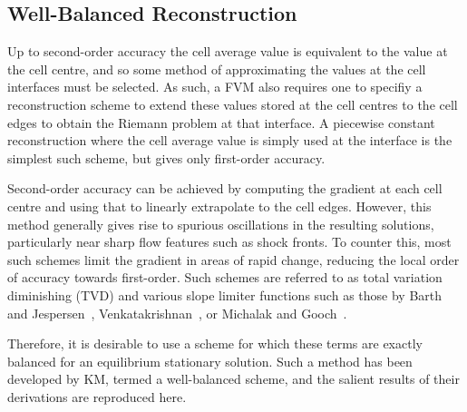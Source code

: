 \subsection{Well-Balanced Reconstruction}
\label{subsec:wellBalanced}

Up to second-order accuracy the cell average value is equivalent to the value at the cell centre, and so some method of approximating the values at the cell interfaces must be selected. As such, a FVM also requires one to specifiy a reconstruction scheme to extend these values stored at the cell centres to the cell edges to obtain the Riemann problem at that interface. A piecewise constant reconstruction where the cell average value is simply used at the interface is the simplest such scheme, but gives only first-order accuracy.

Second-order accuracy can be achieved by computing the gradient at each cell centre and using that to linearly extrapolate to the cell edges. However, this method generally gives rise to spurious oscillations in the resulting solutions, particularly near sharp flow features such as shock fronts. To counter this, most such schemes limit the gradient in areas of rapid change, reducing the local order of accuracy towards first-order. Such schemes are referred to as total variation diminishing (TVD) and various slope limiter functions such as those by Barth and Jespersen~\cite{Barth1989}, Venkatakrishnan~\cite{Venkatakrishnan1993,Venkatakrishnan1995}, or Michalak and Gooch~\cite{Michalak2008}.

Therefore, it is desirable to use a scheme for which these terms are exactly balanced for an equilibrium stationary solution. Such a method has been developed by KM, termed a well-balanced scheme, and the salient results of their derivations are reproduced here.

